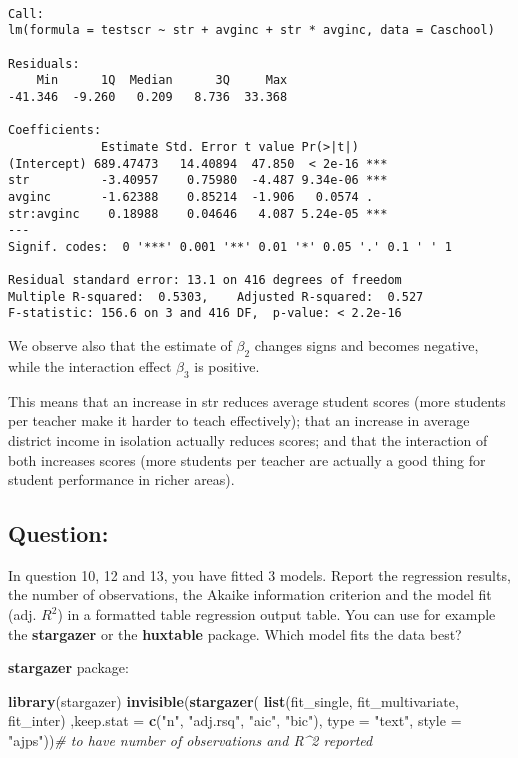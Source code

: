 \documentclass[12pt,]{article}
\newenvironment{Shaded}{\begin{snugshade}}{\end{snugshade}}
\newcommand{\CommentTok}[1]{\textcolor[rgb]{0.56,0.35,0.01}{\textit{#1}}}
\newcommand{\DataTypeTok}[1]{\textcolor[rgb]{0.13,0.29,0.53}{#1}}
\newcommand{\KeywordTok}[1]{\textcolor[rgb]{0.13,0.29,0.53}{\textbf{#1}}}
\newcommand{\NormalTok}[1]{#1}
\newcommand{\StringTok}[1]{\textcolor[rgb]{0.31,0.60,0.02}{#1}}
\begin{document}
\begin{verbatim}

Call:
lm(formula = testscr ~ str + avginc + str * avginc, data = Caschool)

Residuals:
    Min      1Q  Median      3Q     Max 
-41.346  -9.260   0.209   8.736  33.368 

Coefficients:
             Estimate Std. Error t value Pr(>|t|)    
(Intercept) 689.47473   14.40894  47.850  < 2e-16 ***
str          -3.40957    0.75980  -4.487 9.34e-06 ***
avginc       -1.62388    0.85214  -1.906   0.0574 .  
str:avginc    0.18988    0.04646   4.087 5.24e-05 ***
---
Signif. codes:  0 '***' 0.001 '**' 0.01 '*' 0.05 '.' 0.1 ' ' 1

Residual standard error: 13.1 on 416 degrees of freedom
Multiple R-squared:  0.5303,    Adjusted R-squared:  0.527 
F-statistic: 156.6 on 3 and 416 DF,  p-value: < 2.2e-16
\end{verbatim}

We observe also that the estimate of \(\beta_2\) changes signs and
becomes negative, while the interaction effect \(\beta_3\) is positive.

This means that an increase in str reduces average student scores (more
students per teacher make it harder to teach effectively); that an
increase in average district income in isolation actually reduces
scores; and that the interaction of both increases scores (more students
per teacher are actually a good thing for student performance in richer
areas).

\hypertarget{question-13}{%
\subsection{Question:}\label{question-13}}

In question 10, 12 and 13, you have fitted 3 models. Report the
regression results, the number of observations, the Akaike information
criterion and the model fit (adj. \(R^2\)) in a formatted table
regression output table. You can use for example the \textbf{stargazer}
or the \textbf{huxtable} package. Which model fits the data best?

\textbf{stargazer} package:

\begin{Shaded}
\begin{Highlighting}[]
\KeywordTok{library}\NormalTok{(stargazer)}
\KeywordTok{invisible}\NormalTok{(}\KeywordTok{stargazer}\NormalTok{(}
\KeywordTok{list}\NormalTok{(fit_single, }
\NormalTok{fit_multivariate,}
\NormalTok{fit_inter)}
\NormalTok{,}\DataTypeTok{keep.stat =} \KeywordTok{c}\NormalTok{(}\StringTok{"n"}\NormalTok{, }\StringTok{"adj.rsq"}\NormalTok{, }\StringTok{"aic"}\NormalTok{, }\StringTok{"bic"}\NormalTok{), }\DataTypeTok{type =} \StringTok{"text"}\NormalTok{, }\DataTypeTok{style =} \StringTok{"ajps"}\NormalTok{))}\CommentTok{# to have number of observations and R^2 reported}
\end{Highlighting}
\end{Shaded}
\end{document}
